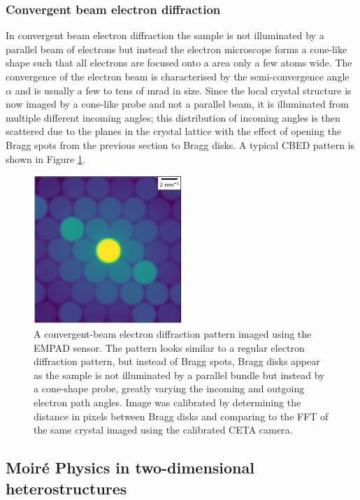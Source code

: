 \subsubsection{Convergent beam electron diffraction}
In convergent beam electron diffraction the sample is not illuminated by a parallel beam of electrons but instead the electron microscope forms a cone-like shape such that all electrons are focused onto a area only a few atoms wide. The convergence of the electron beam is characterised by the semi-convergence angle $\alpha$ and is usually a few to tens of \si{\milli\radian} in size.
Since the local crystal structure is now imaged by a cone-like probe and not a parallel beam, it is illuminated from multiple different incoming angles; this distribution of incoming angles is then scattered due to the planes in the crystal lattice with the effect of opening the Bragg spots from the previous section to Bragg disks. A typical CBED pattern is shown in Figure \ref{fig:pacbed}.

\begin{figure}
    \centering
    \includegraphics[width=0.5\textwidth, keepaspectratio]{resources/Figures/pacbed_hole.png}
    \caption{A convergent-beam electron diffraction pattern imaged using the EMPAD sensor. The pattern looks similar to a regular electron diffraction pattern, but instead of Bragg spots, Bragg disks appear as the sample is not illuminated by a parallel bundle but instead by a cone-shape probe, greatly varying the incoming and outgoing electron path angles. Image was calibrated by determining the distance in pixels between Bragg disks and comparing to the FFT of the same crystal imaged using the calibrated CETA camera.}
    \label{fig:pacbed}
\end{figure}

\subsection{Moiré Physics in two-dimensional heterostructures}

